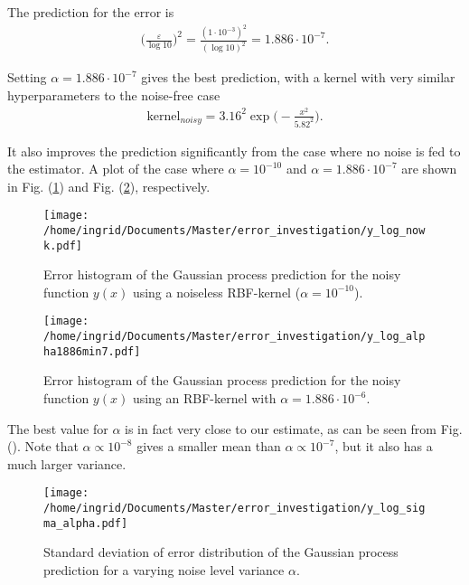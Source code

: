 \documentclass[twoside,english]{uiofysmaster}
\begin{document}
The prediction for the error is
\begin{align*}
\Big( \frac{\varepsilon}{\log 10} \Big)^2 = \frac{(1 \cdot 10^{-3})^2}{(\log 10)^2} = 1.886 \cdot 10^{-7}.
\end{align*}

Setting $\alpha = 1.886 \cdot 10^{-7}$ gives the best prediction, with a kernel with very similar hyperparameters to the noise-free case
\begin{align}
\text{kernel}_{noisy} = 3.16^2 \exp \Big( - \frac{x^2}{5.82^2} \Big).
\end{align}

It also improves the prediction significantly from the case where no noise is fed to the estimator. A plot of the case where $\alpha = 10^{-10}$ and $\alpha = 1.886 \cdot 10^{-7}$ are shown in Fig. (\ref{Fig:: y prediction no noise}) and Fig. (\ref{Fig:: y prediction alpha=1.886}), respectively.

\begin{figure}
\centering
\texttt{[image: /home/ingrid/Documents/Master/error\_investigation/y\_log\_nowk.pdf]}
\caption{Error histogram of the Gaussian process prediction for the noisy function $y(x)$ using a noiseless RBF-kernel ($\alpha = 10^{-10}$).}
\label{Fig:: y prediction no noise}
\end{figure}

\begin{figure}
\centering
\texttt{[image: /home/ingrid/Documents/Master/error\_investigation/y\_log\_alpha1886min7.pdf]}
\caption{Error histogram of the Gaussian process prediction for the noisy function $y(x)$ using an RBF-kernel with $\alpha = 1.886 \cdot 10^{-6}$.}
\label{Fig:: y prediction alpha=1.886}
\end{figure}

The best value for $\alpha$ is in fact very close to our estimate, as can be seen from Fig. (). Note that $\alpha \propto 10^{-8}$ gives a smaller mean than $\alpha \propto 10^{-7}$, but it also has a much larger variance.

\begin{figure}
\centering
\texttt{[image: /home/ingrid/Documents/Master/error\_investigation/y\_log\_sigma\_alpha.pdf]}
\caption{Standard deviation of error distribution of the Gaussian process prediction for a varying noise level variance $\alpha$.}
\label{Fig:: y prediction alpha mu}
\end{figure}
\end{document}

